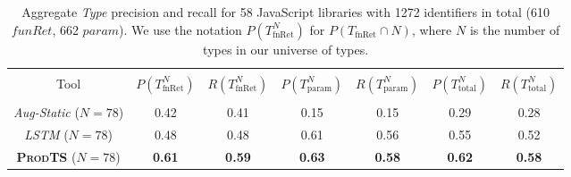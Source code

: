 \documentclass[sigplan,10pt,anonymous]{acmart} %
\newcommand{\prodts}{\textsc{ProdTS}\xspace}
\theoremstyle{plain}
\theoremstyle{remark}
\theoremstyle{definition}
\begin{document}
\begin{table*}[t]
  \centering
  \caption{Aggregate \textit{Type} precision and recall for 58 JavaScript libraries with 1272 identifiers in total (610 $funRet$, 662 $param$).
    We use the notation $P(T^N_\text{fnRet})$ for $P(T_\text{fnRet} \cap N)$, where $N$ is the number of types in our universe of types.}\label{tab:typeprec1}
  \begin{tabular}{ccccccc}
    \toprule                                                                                                                                                                            \\
    Tool                                & $P(T^N_\text{fnRet})$ & $R(T^N_\text{fnRet})$ & $P(T^N_\text{param})$ & $R(T^N_\text{param})$ & $P(T^N_\text{total})$ & $R(T^N_\text{total})$ \\
    \midrule                                                                                                                                                                            \\


    \textit{Aug-Static} \tiny{($N=78$)} & 0.42                  & 0.41                  & 0.15                  & 0.15                  & 0.29                  & 0.28                  \\
    \textit{LSTM} \tiny{($N=78$)}       & 0.48                  & 0.48                  & 0.61                  & 0.56                  & 0.55                  & 0.52                  \\
    \textbf{\prodts} \tiny{($N=78$)}    & \textbf{0.61}         & \textbf{0.59}         & \textbf{0.63}         & \textbf{0.58}
                                        & \textbf{0.62}         & \textbf{0.58}                                                                                                         \\
    \bottomrule
  \end{tabular}
\end{table*}
\end{document}
